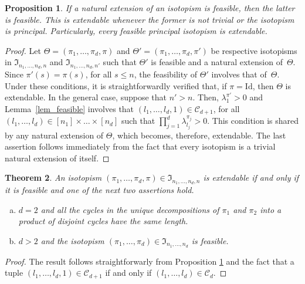 \documentclass{article}
\newtheorem{thm}{Theorem}
\newtheorem{prop}[thm]{Proposition}
\begin{document}
\begin{prop}\label{prop_Board} If a natural extension of an isotopism is feasible, then the latter is feasible. This is extendable whenever the former is not trivial or the isotopism is principal. Particularly, every feasible principal isotopism is extendable.
\end{prop}

\begin{proof} Let $\Theta=(\pi_1,\ldots,\pi_d,\pi)$ and $\Theta'=(\pi_1,\ldots,\pi_d,\pi')$ be respective isotopisms in $\mathfrak{I}_{n_1,\ldots,n_d,n}$ and 
$\mathfrak{I}_{n_1,\ldots,n_d,n'}$ such that $\Theta'$ is feasible and a natural extension of~$\Theta$. Since $\pi'(s)=\pi(s)$, for all $s\leq n$, the feasibility of $\Theta'$ 
involves that of~$\Theta$. Under these conditions, it is straightforwardly verified that, if $\pi=\mathrm{Id}$, then $\Theta$ is extendable. In the general case, suppose that $n'>n$. 
Then, $\lambda_1^{\pi'}>0$ and Lemma~\ref{lem_feasible} involves that $(l_1,\ldots,l_d,1)\in\mathcal{C}_{d+1}$, for all $(l_1,\ldots,l_d)\in [n_1]\times\ldots \times [n_d]$ such that 
$\prod_{j=1}^d\lambda_{l_j}^{\pi_j}>0$. This condition is shared by any natural extension of $\Theta$, which becomes, therefore, extendable. The last assertion follows immediately 
from the fact that every isotopism is a trivial natural extension of itself.
\end{proof}

\vspace{0.1cm}

\begin{thm}\label{thm_Board} An isotopism $(\pi_1,\ldots,\pi_d,\pi)\in\mathfrak{I}_{n_1,\ldots,n_d,n}$ is extendable if and only if it is feasible and one of the next two assertions hold.
\begin{enumerate}[a)]
\item $d=2$ and all the cycles in the unique decompositions of $\pi_1$ and $\pi_2$ into a product of disjoint cycles have the same length.
\item $d>2$ and the isotopism $(\pi_1,\ldots,\pi_d)\in\mathfrak{I}_{n_1,\ldots,n_d}$ is feasible.
\end{enumerate}
\end{thm}

\begin{proof} The result follows straightforwarly from Proposition \ref{prop_Board} and the fact that a tuple $(l_1,\ldots,l_d,1)\in\mathcal{C}_{d+1}$ if and only if 
$(l_1,\ldots,l_d)\in\mathcal{C}_d$.
\end{proof}
\end{document}
